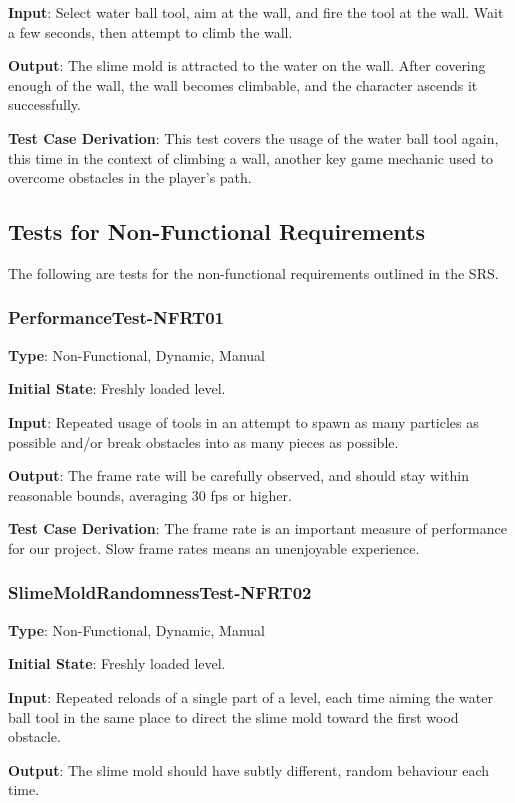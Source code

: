 \documentclass[12pt, titlepage]{article}
\begin{document}
\textbf{Input}: Select water ball tool, aim at the wall, and fire
the tool at the wall. Wait a few seconds, then attempt to climb the wall.

\textbf{Output}: The slime mold is attracted to the water on the wall. After covering
enough of the wall, the wall becomes climbable, and the character ascends it successfully.

\textbf{Test Case Derivation}: This test covers the usage of the water ball tool again,
this time in the context of climbing a wall, another key game mechanic used to overcome
obstacles in the player's path.


\subsection{Tests for Non-Functional Requirements}
The following are tests for the non-functional requirements outlined in the SRS.


\subsubsection{PerformanceTest-NFRT01}

\textbf{Type}: Non-Functional, Dynamic, Manual

\textbf{Initial State}: Freshly loaded level.

\textbf{Input}: Repeated usage of tools in an attempt to spawn as many particles
as possible and/or break obstacles into as many pieces as possible.

\textbf{Output}: The frame rate will be carefully observed, and
should stay within reasonable bounds, averaging 30 fps or higher.

\textbf{Test Case Derivation}: The frame rate is an important measure of
performance for our project. Slow frame rates means an unenjoyable experience.


\subsubsection{SlimeMoldRandomnessTest-NFRT02}

\textbf{Type}: Non-Functional, Dynamic, Manual

\textbf{Initial State}: Freshly loaded level.

\textbf{Input}: Repeated reloads of a single part of a level, each time aiming
the water ball tool in the same place to direct the slime mold toward the first
wood obstacle.

\textbf{Output}: The slime mold should have subtly different, random behaviour each time.
\end{document}

